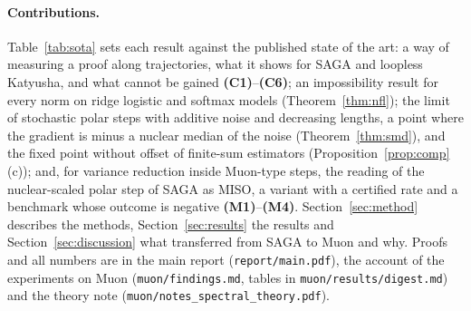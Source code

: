 \documentclass[10pt]{article}
\newcommand{\finding}[1]{\textbf{(#1)}}
\begin{document}
\paragraph{Contributions.} Table~\ref{tab:sota} sets each result against the published state of the art: a way of
measuring a proof along trajectories, what it shows for SAGA and loopless Katyusha, and what cannot be gained
\finding{C1}--\finding{C6}; an impossibility result for every norm on ridge logistic and softmax models
(Theorem~\ref{thm:nfl}); the limit of stochastic polar steps with additive noise and decreasing lengths, a point where
the gradient is minus a nuclear median of the noise (Theorem~\ref{thm:smd}), and the fixed point without offset of
finite-sum estimators (Proposition~\ref{prop:comp}(c)); and, for variance reduction inside Muon-type steps, the
reading of the nuclear-scaled polar step of SAGA as MISO, a variant with a certified rate and a benchmark whose
outcome is negative \finding{M1}--\finding{M4}. Section~\ref{sec:method} describes the methods,
Section~\ref{sec:results} the results and Section~\ref{sec:discussion} what transferred from SAGA to Muon and why.
Proofs and all numbers are in the main report (\texttt{report/main.pdf}), the account of the experiments on Muon
(\texttt{muon/findings.md}, tables in \texttt{muon/results/digest.md}) and the theory note
(\texttt{muon/notes\_spectral\_theory.pdf}).
\end{document}
